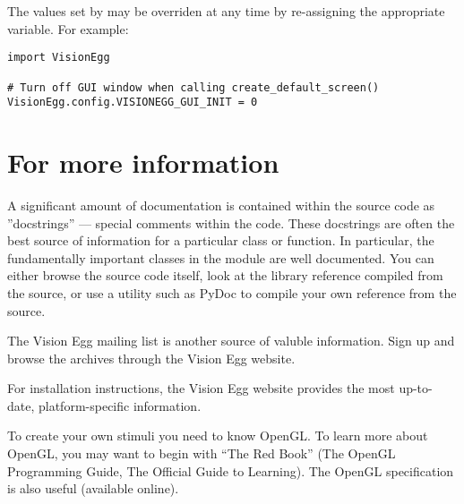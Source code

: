 \documentclass{manual}
\begin{document}
The values set by  may be overriden at
any time by re-assigning the appropriate variable.  For example:

\begin{verbatim}
import VisionEgg

# Turn off GUI window when calling create_default_screen()
VisionEgg.config.VISIONEGG_GUI_INIT = 0
\end{verbatim}

\section{For more information}

A significant amount of documentation is contained within the source
code as ''docstrings'' --- special comments within the code.  These
docstrings are often the best source of information for a particular
class or function. In particular, the fundamentally important classes
in the  module are well documented.  You can
either browse the source code itself, look at the library reference
compiled from the source, or use a utility such as PyDoc to compile
your own reference from the source.

The Vision Egg mailing list is another source of valuble information.
Sign up and browse the archives through the Vision Egg website.

For installation instructions, the Vision Egg website provides the
most up-to-date, platform-specific information.

To create your own stimuli you need to know OpenGL.  To learn more
about OpenGL, you may want to begin with ``The Red Book'' (The OpenGL
Programming Guide, The Official Guide to Learning).  The OpenGL
specification is also useful (available online).


\end{document}
